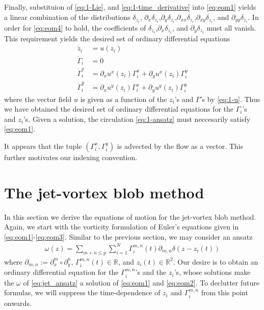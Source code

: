 \documentclass[12pt]{amsart}
\begin{document}
Finally, substituion of \eqref{eq:1-Lie}, and \eqref{eq:1-time_derivative} into \eqref{eq:eom1} yields
a linear combination of the distributions
$\delta_{z_i}$, $\partial_x\delta_{z_i}$,$\partial_y \delta_{z_i}$,$\partial_{xx} \delta_{z_i}$,$\partial_{xy} \delta_{z_i}$, and $\partial_{yy} \delta_{z_i}$.
In order for \eqref{eq:eom4} to hold, the coefficients of $\delta_{z_i}$,$\partial_x \delta_{z_i}$, and $\partial_y \delta_{z_i}$ must all vanish.
This requirement yields the desired set of ordinary differential equations
\begin{align*}
  \dot{z}_i &= u(z_i) \\
  \dot{\Gamma}_i &= 0 \\
  \dot{\Gamma}^x_i  &= \partial_x u^x(z_i) \Gamma^x_i + \partial_y u^x(z_i) \Gamma_i^y \\
  \dot{\Gamma}^y_i  &= \partial_x u^y(z_i) \Gamma^x_i + \partial_y u^y(z_i) \Gamma_i^y 
\end{align*}
where the vector field $u$ is given as a function of the $z_i$'s and $\Gamma$'s by \eqref{eq:1-u}.
Thus we have obtained the desired set of ordinary differential equations for the $\Gamma_i$'s and $z_i$'s.
Given a solution, the circulation \eqref{eq:1-ansatz} must neccesarily satisfy \eqref{eq:eom1}.

  It appears that the tuple $(\Gamma_i^x,\Gamma_i^y)$ is advected by the flow as a vector.  This further motivates our indexing convention.



\section{The jet-vortex blob method}
\label{sec:jet_vortex_blob}
In this section we derive the equations of motion for the
jet-vortex blob method.
Again, we start with the vorticity formulation of Euler's equations 
given in \eqref{eq:eom1}-\eqref{eq:eom3}.
Similar to the previous section, we may consider an ansatz
\begin{align}
  \omega(z) = \sum_{m+n \leq p} \sum_{i=1}^N \Gamma_i^{m,n}(t) \partial_{m,n} \delta(z-z_i(t))
  \label{eq:jet_ansatz}
\end{align}
where $\partial_{m,n} := \partial_x^m \circ \partial_y^n$,
$\Gamma_i^{m,n}(t) \in \mathbb{R}$,
and $z_i(t) \in \mathbb{R}^2$.
Our desire is to obtain an ordinary differential equation for the $\Gamma^{m,n}_i$'s and the $z_i$'s,
whose solutions make the $\omega$ of \eqref{eq:jet_ansatz} a solution of \eqref{eq:eom1} and \eqref{eq:eom2}.
To declutter future formulas,
we will suppress the time-dependence of $z_i$ and $\Gamma^{m,n}_i$
from this point onwards.
\end{document}
